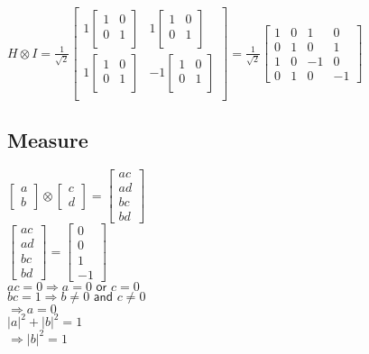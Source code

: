 \documentclass{iansnotes}
\begin{document}
\noindent $H \otimes I = \frac{1}{\sqrt{2}} \begin{bmatrix}
  1 \begin{bmatrix} 1 & 0 \\ 0 & 1 \\ \end{bmatrix} & 1 \begin{bmatrix} 1 & 0 \\ 0 & 1 \\ \end{bmatrix} \\[5mm]
  1 \begin{bmatrix} 1 & 0 \\ 0 & 1 \\ \end{bmatrix} & -1 \begin{bmatrix} 1 & 0 \\ 0 & 1 \\ \end{bmatrix} \\
\end{bmatrix} = \frac{1}{\sqrt{2}} \begin{bmatrix} 1 & 0 & 1 & 0 \\ 0 & 1 & 0 & 1 \\ 1 & 0 & -1 & 0 \\ 0 & 1 & 0 & -1 \end{bmatrix}$


\subsection{Measure}

$\begin{bmatrix} a \\ b \end{bmatrix} \otimes \begin{bmatrix} c \\ d \end{bmatrix} = \begin{bmatrix} ac \\ ad \\ bc \\ bd \end{bmatrix}$ \\[12mm]
$\begin{bmatrix} ac \\ ad \\ bc \\ bd \end{bmatrix} = \begin{bmatrix} 0 \\ 0 \\ 1 \\ -1 \end{bmatrix}$ \\[12mm]
$ac = 0 \Rightarrow a = 0 \textsf{ or } c = 0$ \\[6mm]
$bc = 1 \Rightarrow b \neq 0 \textsf{ and } c \neq 0$ \\[6mm]
$\Rightarrow a = 0$ \\[6mm]
$|a|^2 + |b|^2 = 1$ \\[6mm]
$\Rightarrow |b|^2 = 1$ \\[6mm]
\end{document}
